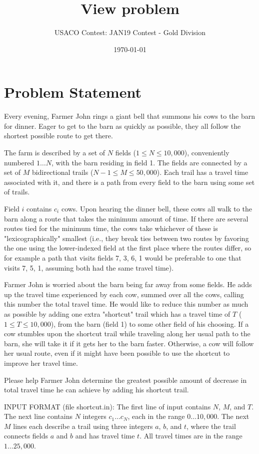\documentclass[12pt]{article}
\title{View problem}
\author{USACO Contest: JAN19 Contest - Gold Division}
\date{\today}
\begin{document}
\maketitle

\section*{Problem Statement}

Every evening, Farmer John rings a giant bell that summons his cows to the barn
for dinner.  Eager to get to the barn as quickly as possible, they all follow
the shortest possible route to get there.

The farm is described by a set of $N$ fields ($1 \leq N \leq 10,000$),
conveniently numbered $1 \ldots N$, with the barn residing in field 1. The
fields are connected by a set of $M$ bidirectional trails
($N-1 \leq M \leq 50,000$).  Each trail has a travel time associated with it,
and there is a path from every field to the barn using some set of trails.

Field $i$ contains $c_i$ cows.  Upon hearing the dinner bell, these  cows all
walk to the barn along a route that takes the minimum amount of time.  If there
are several routes tied for the minimum time, the cows take whichever of these
is "lexicographically" smallest (i.e., they break ties between two routes  by
favoring the one using the lower-indexed field at the first place where the
routes differ, so for example a path that visits fields 7, 3, 6, 1 would be
preferable to one that visits 7, 5, 1, assuming both had the same travel time).

Farmer John is worried about the barn being far away from some fields. He adds
up the travel time experienced by each cow, summed over all the cows, calling
this number the total travel time.  He would like to reduce this number as much
as possible by adding one extra "shortcut" trail which has a travel time of $T$ 
($1 \leq T \leq 10,000$), from the barn (field 1) to some other field of his
choosing. If a cow stumbles upon the shortcut trail while traveling along  her
usual path to the barn, she will take it if it gets her to the barn faster. 
Otherwise, a cow will follow her usual route, even if it might have been
possible to use the shortcut to improve her travel time.

Please help Farmer John determine the greatest possible amount of decrease in
total travel time he can achieve by adding his shortcut trail.

INPUT FORMAT (file shortcut.in):
The first line of input contains $N$, $M$, and $T$.  The next line contains
$N$ integers $c_1 \ldots c_N$, each in the range $0 \ldots 10,000$.  The next $M$
lines each describe a trail using three integers $a$, $b$, and $t$, where the
trail connects fields $a$ and $b$ and has travel time $t$.  All travel times are
in the range $1 \ldots 25,000$.
\end{document}
